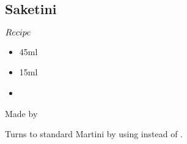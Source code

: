 \subsection{Saketini}
\begin{itembox}[l]{\boldmath $Recipe$}
\begin{itemize}
\setlength{\parskip}{0cm}
\setlength{\itemsep}{0cm}
\item \gin 45ml
\item \sake 15ml
\item {}
\end{itemize}
\vspace{-4mm}
Made by \stir
\end{itembox}
Turns to standard Martini by using \vermouth instead of \sake
\hspace{-1mm}.
